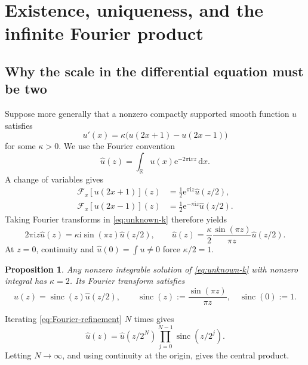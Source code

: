 \documentclass[11pt]{article}
\numberwithin{equation}{section}
\newtheorem{proposition}[theorem]{Proposition}
\theoremstyle{definition}
\theoremstyle{remark}
\newcommand{\R}{\mathbb R}
\newcommand{\sinc}{\operatorname{sinc}}
\newcommand{\dd}{\,\mathrm d}
\newcommand{\e}{\mathrm e}
\newcommand{\ii}{\mathrm i}
\begin{document}
\section{Existence, uniqueness, and the infinite Fourier product}\label{sec:existence}

\subsection{Why the scale in the differential equation must be two}

Suppose more generally that a nonzero compactly supported smooth function $u$ satisfies
\begin{equation}\label{eq:unknown-k}
 u'(x)=\kappa\bigl(u(2x+1)-u(2x-1)\bigr)
\end{equation}
for some $\kappa>0$.  We use the Fourier convention
\begin{equation}\label{eq:Fourier-convention}
 \widehat u(z)=\int_{\R}u(x)\e^{-2\pi\ii xz}\dd x.
\end{equation}
A change of variables gives
\begin{align*}
 \mathcal F_x[u(2x+1)](z)&=\tfrac12\e^{\pi\ii z}\widehat u(z/2),\\
 \mathcal F_x[u(2x-1)](z)&=\tfrac12\e^{-\pi\ii z}\widehat u(z/2).
\end{align*}
Taking Fourier transforms in \eqref{eq:unknown-k} therefore yields
\begin{equation}\label{eq:Fourier-refinement-k}
 2\pi\ii z\widehat u(z)=\kappa\ii\sin(\pi z)\widehat u(z/2),
 \qquad
 \widehat u(z)=\frac{\kappa}{2}\frac{\sin(\pi z)}{\pi z}\widehat u(z/2).
\end{equation}
At $z=0$, continuity and $\widehat u(0)=\int u\ne0$ force $\kappa/2=1$.

\begin{proposition}\label{prop:k-two}
Any nonzero integrable solution of \eqref{eq:unknown-k} with nonzero integral has $\kappa=2$.  Its Fourier transform satisfies
\begin{equation}\label{eq:Fourier-refinement}
 \widehat u(z)=\sinc(z)\widehat u(z/2),
 \qquad
 \sinc(z):=\frac{\sin(\pi z)}{\pi z},\quad \sinc(0):=1.
\end{equation}
\end{proposition}

Iterating \eqref{eq:Fourier-refinement} $N$ times gives
\begin{equation}\label{eq:finite-Fourier-product}
 \widehat u(z)=\widehat u(z/2^N)\prod_{j=0}^{N-1}\sinc(z/2^j).
\end{equation}
Letting $N\to\infty$, and using continuity at the origin, gives the central product.
\end{document}
